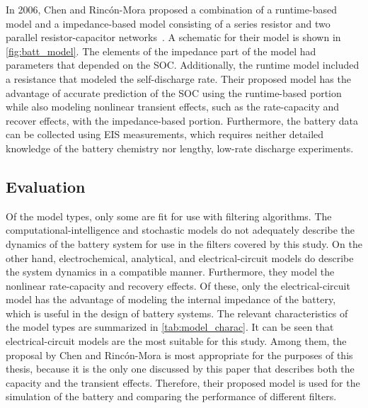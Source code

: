 \documentclass[../zhang_thesis.tex]{subfiles}
\begin{document}
In 2006, Chen and Rinc\'on-Mora proposed a combination of a runtime-based model and a impedance-based model consisting of a series resistor and two parallel resistor-capacitor networks~\cite{chen06}. A schematic for their model is shown in \cref{fig:batt_model}. The elements of the impedance part of the model had parameters that depended on the SOC. Additionally, the runtime model included a resistance that modeled the self-discharge rate. Their proposed model has the advantage of
accurate prediction of the SOC using the runtime-based portion while also modeling nonlinear transient effects, such as the rate-capacity and recover effects, with the impedance-based portion. Furthermore, the battery data can be collected using EIS measurements, which requires neither detailed knowledge of the battery chemistry nor lengthy, low-rate discharge experiments.

\subsection{Evaluation}

Of the model types, only some are fit for use with filtering algorithms. The computational-intelligence and stochastic models do not adequately describe the dynamics of the battery system for use in the filters covered by this study. On the other hand, electrochemical, analytical, and electrical-circuit models do describe the system dynamics in a compatible manner. Furthermore, they model the nonlinear rate-capacity and recovery effects. Of these, only the electrical-circuit model has the
advantage of modeling the internal impedance of the battery, which is useful in the design of battery systems. The relevant characteristics of the model types are summarized in \cref{tab:model_charac}. It can be seen that electrical-circuit models are the most suitable for this study. Among them, the proposal by Chen and Rinc\'on-Mora is most appropriate for the purposes of this thesis, because it is the only one discussed by this paper that describes both the capacity and the transient
effects. Therefore, their proposed model is used for the simulation of the battery and comparing the performance of different filters.
\end{document}
